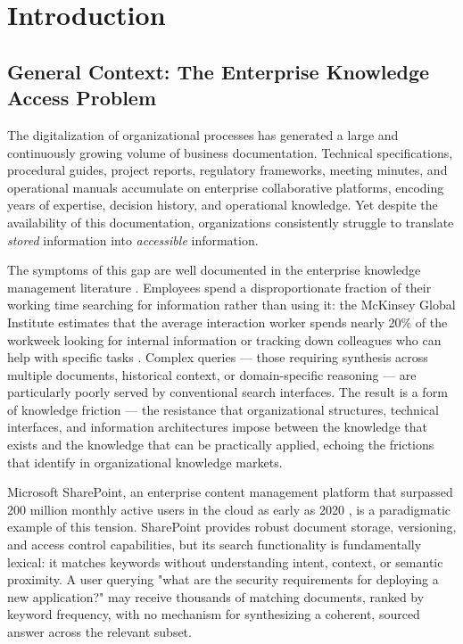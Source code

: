 \chapter{Introduction}
\label{chap:introduction}

\section{General Context: The Enterprise Knowledge Access Problem}
\label{sec:intro-context}

The digitalization of organizational processes has generated a large and continuously growing volume of business documentation. Technical specifications, procedural guides, project reports, regulatory frameworks, meeting minutes, and operational manuals accumulate on enterprise collaborative platforms, encoding years of expertise, decision history, and operational knowledge. Yet despite the availability of this documentation, organizations consistently struggle to translate \textit{stored} information into \textit{accessible} information.

The symptoms of this gap are well documented in the enterprise knowledge management literature \citep{Alavi2001, Davenport1998}. Employees spend a disproportionate fraction of their working time searching for information rather than using it: the McKinsey Global Institute estimates that the average interaction worker spends nearly 20\% of the workweek looking for internal information or tracking down colleagues who can help with specific tasks \citep{McKinsey2012}. Complex queries — those requiring synthesis across multiple documents, historical context, or domain-specific reasoning — are particularly poorly served by conventional search interfaces. The result is a form of knowledge friction — the resistance that organizational structures, technical interfaces, and information architectures impose between the knowledge that exists and the knowledge that can be practically applied, echoing the frictions that \citet{Davenport1998} identify in organizational knowledge markets.

Microsoft SharePoint, an enterprise content management platform that surpassed 200 million monthly active users in the cloud as early as 2020 \citep{Spataro2020}, is a paradigmatic example of this tension. SharePoint provides robust document storage, versioning, and access control capabilities, but its search functionality is fundamentally lexical: it matches keywords without understanding intent, context, or semantic proximity. A user querying "what are the security requirements for deploying a new application?" may receive thousands of matching documents, ranked by keyword frequency, with no mechanism for synthesizing a coherent, sourced answer across the relevant subset.

